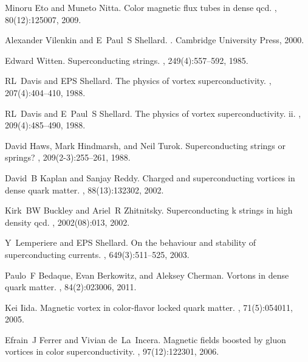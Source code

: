 \documentclass[prd, showpacs,nofootinbib,amsmath,amssymb]{revtex4}
\begin{document}
\begin{thebibliography}{99}
Minoru Eto and Muneto Nitta.
\newblock Color magnetic flux tubes in dense qcd.
, 80(12):125007, 2009.

Alexander Vilenkin and E~Paul~S Shellard.
.
\newblock Cambridge University Press, 2000.

Edward Witten.
\newblock Superconducting strings.
, 249(4):557--592, 1985.

RL~Davis and EPS Shellard.
\newblock The physics of vortex superconductivity.
, 207(4):404--410, 1988.

RL~Davis and E~Paul~S Shellard.
\newblock The physics of vortex superconductivity. ii.
, 209(4):485--490, 1988.

David Haws, Mark Hindmarsh, and Neil Turok.
\newblock Superconducting strings or springs?
, 209(2-3):255--261, 1988.

David~B Kaplan and Sanjay Reddy.
\newblock Charged and superconducting vortices in dense quark matter.
, 88(13):132302, 2002.

Kirk~BW Buckley and Ariel~R Zhitnitsky.
\newblock Superconducting k strings in high density qcd.
, 2002(08):013, 2002.

Y~Lemperiere and EPS Shellard.
\newblock On the behaviour and stability of superconducting currents.
, 649(3):511--525, 2003.

Paulo~F Bedaque, Evan Berkowitz, and Aleksey Cherman.
\newblock Vortons in dense quark matter.
, 84(2):023006, 2011.

Kei Iida.
\newblock Magnetic vortex in color-flavor locked quark matter.
, 71(5):054011, 2005.

Efrain~J Ferrer and Vivian de~La~Incera.
\newblock Magnetic fields boosted by gluon vortices in color superconductivity.
, 97(12):122301, 2006.

\end{thebibliography}
\end{document}
